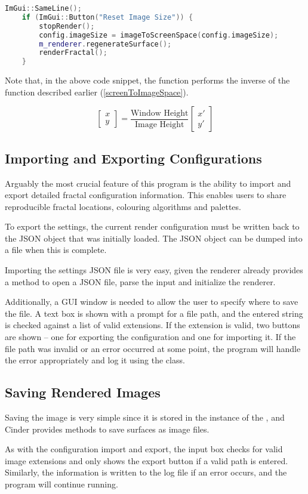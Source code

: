 \begin{lstlisting}[language=c++]
	ImGui::SameLine();
	if (ImGui::Button("Reset Image Size")) {
		stopRender();
		config.imageSize = imageToScreenSpace(config.imageSize);
		m_renderer.regenerateSurface();
		renderFractal();
	}
\end{lstlisting}

Note that, in the above code snippet, the  function performs the inverse of the  function described earlier (\ref{screenToImageSpace}).

\begin{equation*}
	\begin{bmatrix} x \\ y \end{bmatrix} = \frac{\text{Window Height}}{\text{Image Height}} \begin{bmatrix} x' \\ y' \end{bmatrix}
\end{equation*}

\subsection{Importing and Exporting Configurations}

Arguably the most crucial feature of this program is the ability to import and export detailed fractal configuration information. This enables users to share reproducible fractal locations, colouring algorithms and palettes.

To export the settings, the current render configuration must be written back to the JSON object that was initially loaded. The JSON object can be dumped into a file when this is complete.

Importing the settings JSON file is very easy, given the renderer already provides a method to open a JSON file, parse the input and initialize the renderer.

Additionally, a GUI window is needed to allow the user to specify where to save the file. A text box is shown with a prompt for a file path, and the entered string is checked against a list of valid extensions. If the extension is valid, two buttons are shown -- one for exporting the configuration and one for importing it. If the file path was invalid or an error occurred at some point, the program will handle the error appropriately and log it using the  class.

\subsection{Saving Rendered Images}

Saving the image is very simple since it is stored in the  instance of the , and Cinder provides methods to save surfaces as image files.

As with the configuration import and export, the input box checks for valid image extensions and only shows the export button if a valid path is entered. Similarly, the information is written to the log file if an error occurs, and the program will continue running.
